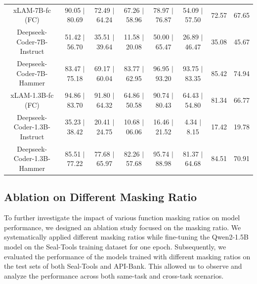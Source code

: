 \documentclass{article}
\begin{document}
\begin{table}[ht]
\begin{tabular}{cccccc|cc}
\midrule
xLAM-7B-fc (FC) & 90.05 $|$ 80.69 & 72.49 $|$ 64.24 & 67.26 $|$ 58.96 & 78.97 $|$ 76.87 & 54.09 $|$ 57.50 & 72.57 & 67.65 \\
Deepseek-Coder-7B-Instruct & 51.42 $|$ 56.70 & 35.51 $|$ 39.64 & 11.58 $|$ 20.08 & 50.00 $|$ 65.47 & 26.89 $|$ 46.47 & 35.08 & 45.67 \\
\rowcolor[HTML]{EFEFEF} Deepseek-Coder-7B-Hammer & 83.47 $|$ 75.18 & 69.17 $|$ 60.04 & 83.77 $|$ 62.95 & 96.95 $|$ 93.20 & 93.75 $|$ 83.35 & 85.42 & 74.94 \\
xLAM-1.3B-fc (FC) & 94.86 $|$ 83.70 & 91.80 $|$ 64.32 & 64.86 $|$ 50.58 & 90.74 $|$ 80.43 & 64.43 $|$ 54.80 & 81.34 & 66.77 \\
Deepseek-Coder-1.3B-Instruct & 35.23 $|$ 38.42 & 20.41 $|$ 24.75 & 10.68 $|$ 06.06 & 16.46 $|$ 21.52 & 4.34 $|$ 8.15 & 17.42 & 19.78 \\
\rowcolor[HTML]{EFEFEF} Deepseek-Coder-1.3B-Hammer & 85.51 $|$ 77.22 & 77.68 $|$ 65.97 & 82.26 $|$ 57.68 & 95.74 $|$ 88.98 & 81.37 $|$ 64.68 & 84.51 & 70.91 \\
\bottomrule
\end{tabular}
\end{table}


\subsection{Ablation on Different Masking Ratio} 

To further investigate the impact of various function masking ratios on model performance, we designed an ablation study focused on the masking ratio. We systematically applied different masking ratios while fine-tuning the Qwen2-1.5B model on the Seal-Tools training dataset for one epoch. Subsequently, we evaluated the performance of the models trained with different masking ratios on the test sets of both Seal-Tools and API-Bank. This allowed us to observe and analyze the performance across both same-task and cross-task scenarios. 
\end{document}
